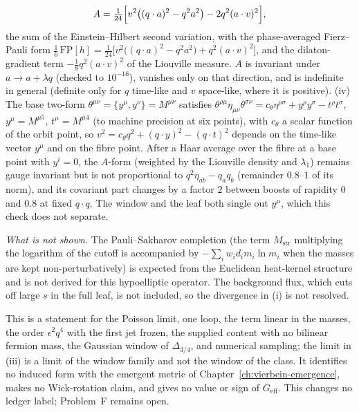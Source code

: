 \[
A=\tfrac1{24}\Bigl[v^2\bigl((q\cdot a)^2-q^2a^2\bigr)-2q^2(a\cdot v)^2\Bigr],
\]
the sum of the Einstein--Hilbert second variation, with the phase-averaged Fierz--Pauli form \(\tfrac16\,\mathrm{FP}[h]=\tfrac1{24}\bigl[v^2\bigl((q\cdot a)^2-q^2a^2\bigr)+q^2(a\cdot v)^2\bigr]\), and the dilaton-gradient term \(-\tfrac18q^2(a\cdot v)^2\) of the Liouville measure. \(A\) is invariant under \(a\to a+\lambda q\) (checked to \(10^{-16}\)), vanishes only on that direction, and is indefinite in general (definite only for \(q\) time-like and \(v\) space-like, where it is positive). (iv) The base two-form \(\theta^{\mu\nu}=\{y^\mu,y^\nu\}=M^{\mu\nu}\) satisfies \(\theta^{\rho\mu}\eta_{\mu\nu}\theta^{\sigma\nu}=c_\theta\eta^{\rho\sigma}+y^\rho y^\sigma-t^\rho t^\sigma\), \(y^\mu=M^{\mu5}\), \(t^\mu=M^{\mu4}\) (to machine precision at six points), with \(c_\theta\) a scalar function of the orbit point, so \(v^2=c_\theta q^2+(q\cdot y)^2-(q\cdot t)^2\) depends on the time-like vector \(y^\mu\) and on the fibre point. After a Haar average over the fibre at a base point with \(y^i=0\), the \(A\)-form (weighted by the Liouville density and \(\lambda_1\)) remains gauge invariant but is not proportional to \(q^2\eta_{ab}-q_aq_b\) (remainder \(0.8\)--\(1\) of its norm), and its covariant part changes by a factor \(2\) between boosts of rapidity \(0\) and \(0.8\) at fixed \(q\cdot q\). The window and the leaf both single out \(y^\mu\), which this check does not separate.

\emph{What is not shown.} The Pauli--Sakharov completion (the term \(M_{\mathrm{str}}\) multiplying the logarithm of the cutoff is accompanied by \(-\sum_iw_id_im_i\ln m_i\) when the masses are kept non-perturbatively) is expected from the Euclidean heat-kernel structure and is not derived for this hypoelliptic operator. The background flux, which cuts off large \(s\) in the full leaf, is not included, so the divergence in (i) is not resolved.

This is a statement for the Poisson limit, one loop, the term linear in the masses, the order \(\epsilon^2q^4\) with the first jet frozen, the supplied content with no bilinear fermion mass, the Gaussian window of \(\Delta_{3/4}\), and numerical sampling; the limit in (iii) is a limit of the window family and not the window of the class. It identifies no induced form with the emergent metric of Chapter~\ref{ch:vierbein-emergence}, makes no Wick-rotation claim, and gives no value or sign of \(G_{\mathrm{eff}}\). This changes no ledger label; Problem~F remains open.

